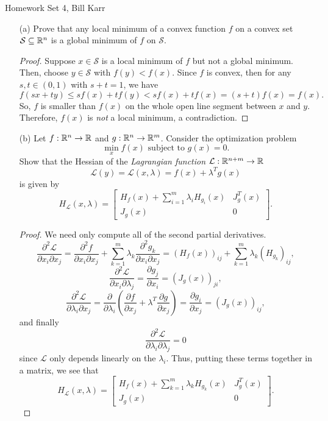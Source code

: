 \documentclass[10pt]{article}
\newcommand{\set}{\mathcal{S}}
\newcommand{\LL}{\mathcal{L}}
\begin{document}
%
{Homework Set 4, Bill Karr}


\begin{itemize}

\item[(a)] Prove that any local minimum of a convex function $f$ on a convex set $ \set \subseteq \R^n $ is a global minimum of $f$ on $\set$.

\begin{proof}
Suppose $ x \in \set $ is a local minimum of $f$ but not a global minimum. Then, choose $ y \in \set $ with $ f(y) < f(x) $. Since $f$ is convex, then for any $ s,t \in (0,1) $ with $ s + t = 1 $, we have $$
f(sx + ty) \leq sf(x) + tf(y) < sf(x) + tf(x) = (s + t)f(x) = f(x).
$$ So, $ f $ is smaller than $f(x)$ on the whole open line segment between $x$ and $y$. Therefore, $f(x)$ is \textit{not} a local minimum, a contradiction. \end{proof}

\item[(b)] Let $ f : \mathbb{R}^n \to \mathbb{R} $ and $ g : \mathbb{R}^n \to \mathbb{R}^m $. Consider the optimization problem $$
\min_{x} f(x) \text{ subject to } g(x) = 0.
$$ Show that the Hessian of the \textit{Lagrangian function} $ \LL : \R^{n+m} \to \R $ $$
\LL(y) = \LL(x,\lambda) = f(x) + \lambda^T g(x)
$$ is given by $$
H_\LL (x,\lambda) = \begin{bmatrix}
H_f(x) + \sum_{i = 1}^m \lambda_i H_{g_i}(x) & J^T_{g}(x) \\
J_{g}(x) & 0
\end{bmatrix}.
$$

\begin{proof}
We need only compute all of the second partial derivatives. $$
\frac{\partial^2 \LL}{\partial x_i \partial x_j}
= \frac{\partial^2 f}{\partial x_i \partial x_j} + \sum_{k=1}^m \lambda_k \frac{\partial^2 g_k}{\partial x_i \partial x_j} = 
(H_f(x))_{ij} + \sum_{k = 1}^m \lambda_k (H_{g_k})_{ij},
$$ $$
\frac{\partial^2 \LL}{\partial x_i \partial \lambda_j}
= \frac{\partial g_j}{\partial x_i} = ( J_{g}(x) )_{ji},
$$ $$
\frac{\partial^2 \LL}{\partial \lambda_i \partial x_j}
= \frac{\partial}{\partial \lambda_i} \left( \frac{\partial f}{\partial x_j} + \lambda^T \frac{\partial g}{\partial x_j} \right) = \frac{\partial g_i}{\partial x_j} = (J_g(x))_{ij},
$$ and finally $$
\frac{\partial^2 \LL}{\partial \lambda_i \partial \lambda_j} = 0
$$ since $ \LL $ only depends linearly on the $\lambda_i$. Thus, putting these terms together in a matrix, we see that $$
H_\LL (x,\lambda) = \begin{bmatrix}
H_f(x) + \sum_{k = 1}^m \lambda_k H_{g_k}(x) & J^T_{g}(x) \\
J_{g}(x) & 0
\end{bmatrix}.
$$ \end{proof}


\end{itemize}
\end{document}
